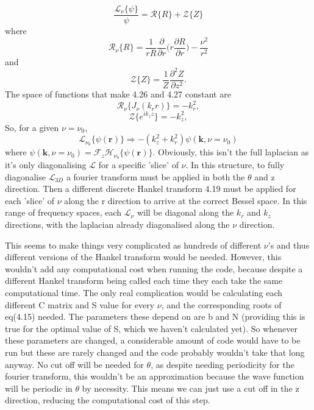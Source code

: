 \documentclass[10pt]{article}
\numberwithin{equation}{section}
\begin{document}
\begin{multicols}{2}
\begin{equation}
\frac{\mathcal{L_{\nu}}\{\psi\}}{\psi}=\mathcal{R}\{R\}+\mathcal{Z}\{Z\}
\end{equation}
where 
\begin{equation}
\mathcal{R}_{\nu}\{R\}=\frac{1}{rR}\frac{\partial}{\partial r}\bigg(r\frac{\partial R}{\partial r}\bigg)-\frac{\nu^{2}}{r^{2}}
\end{equation}
and
\begin{equation}
\mathcal{Z}\{Z\}=\frac{1}{Z}\frac{\partial^{2}Z}{\partial z^{2}}.
\end{equation}
The space of functions that make 4.26 and 4.27 constant are 
\begin{equation}
\mathcal{R}_{\nu}\{J_{\nu}(k_{r}r)\}=-k^{2}_{r},
\end{equation}
\begin{equation}
\mathcal{Z}\{e^{ik_{z}z}\}=-k^{2}_{z},
\end{equation}
So, for a given $\nu=\nu_{0}$, 
\begin{equation}
\mathcal{L}_{\nu_{0}}\{\psi(\textbf{r})\} \Rightarrow -(k^{2}_{z}+k^{2}_{r})\psi(\textbf{k},\nu=\nu_{0})
\end{equation}
where $\psi(\textbf{k},\nu=\nu_{0}) = \mathcal{F}_{z}\mathcal{H}_{\nu_{0}}\{\psi(\textbf{r})\}$. Obviously, this isn't the full laplacian as it's only diagonalising $\mathcal{L}$ for a specific 'slice' of $\nu$. In this structure, to fully diagonalise $\mathcal{L}_{3D}$ a fourier transform must be applied in both the $\theta$ and z direction. Then a different discrete Hankel transform 4.19 must be applied for each 'slice' of $\nu$ along the r direction to arrive at the correct Bessel space. In this range of frequency spaces, each $\mathcal{L}_{\nu}$ will be diagonal along the $k_{r}$ and $k_{z}$ directions, with the laplacian already diagonalised along the $\nu$ direction.
 
This seems to make things very complicated as hundreds of different $\nu$'s and thus different versions of the Hankel transform would be needed. However, this wouldn't add any computational cost when running the code, because despite a different Hankel transform being called each time they each take the same computational time. The only real complication would be calculating each different C matrix and S value for every $\nu$, and the corresponding roots of eq(4.15) needed. The parameters these depend on are b and N (providing this is true for the optimal value of S, which we haven't calculated yet). So whenever these parameters are changed, a considerable amount of code would have to be run but these are rarely changed and the code probably wouldn't take that long anyway. No cut off will be needed for $\theta$, as despite needing periodicity for the fourier transform, this wouldn't be an approximation because the wave function will be periodic in $\theta$ by necessity. This means we can just use a cut off in the z direction, reducing the computational cost of this step. 



\end{multicols}
\end{document}
